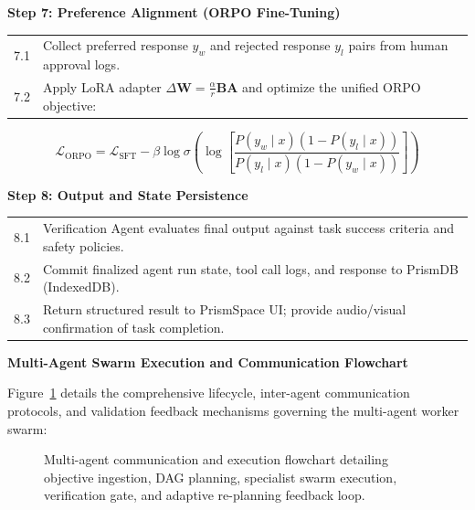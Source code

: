 \documentclass[12pt,a4paper]{report}
\begin{document}
\vspace{8pt}
\noindent\textbf{Step 7: Preference Alignment (ORPO Fine-Tuning)}
\vspace{4pt}

\noindent\begin{tabular}{p{1cm} p{12.5cm}}
7.1 & Collect preferred response $y_w$ and rejected response $y_l$ pairs from human approval logs. \\
7.2 & Apply LoRA adapter $\Delta\mathbf{W} = \frac{\alpha}{r}\mathbf{B}\mathbf{A}$ and optimize the unified ORPO objective: \\
\end{tabular}
\begin{equation}
    \mathcal{L}_{\mathrm{ORPO}} = \mathcal{L}_{\mathrm{SFT}} - \beta \log \sigma \left( \log \left[ \frac{P(y_w \mid x)(1 - P(y_l \mid x))}{P(y_l \mid x)(1 - P(y_w \mid x))} \right] \right)
\end{equation}

\vspace{4pt}
\noindent\textbf{Step 8: Output and State Persistence}
\vspace{4pt}

\noindent\begin{tabular}{p{1cm} p{12.5cm}}
8.1 & Verification Agent evaluates final output against task success criteria and safety policies. \\
8.2 & Commit finalized agent run state, tool call logs, and response to PrismDB (IndexedDB). \\
8.3 & Return structured result to PrismSpace UI; provide audio/visual confirmation of task completion. \\
\end{tabular}


\vspace{8pt}
\noindent\textbf{Multi-Agent Swarm Execution and Communication Flowchart}
\vspace{4pt}

Figure~\ref{fig:multiagent_flowchart} details the comprehensive lifecycle, inter-agent communication protocols, and validation feedback mechanisms governing the multi-agent worker swarm:

\begin{figure}[H]
    \centering
    \caption{Multi-agent communication and execution flowchart detailing objective ingestion, DAG planning, specialist swarm execution, verification gate, and adaptive re-planning feedback loop.}
    \label{fig:multiagent_flowchart}
\end{figure}
\end{document}
